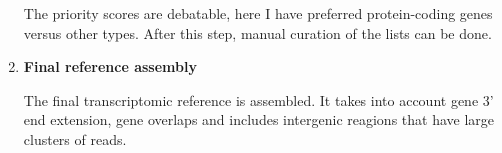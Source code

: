 \begin{enumerate}
  The priority scores are debatable, here I have preferred protein-coding genes versus other types.
  After this step, manual curation of the lists can be done.
  
  \item \textbf{Final reference assembly}
  
  The final transcriptomic reference is assembled.
  It takes into account gene 3' end extension, gene overlaps and includes intergenic reagions that have large clusters of reads.

\end{enumerate}
